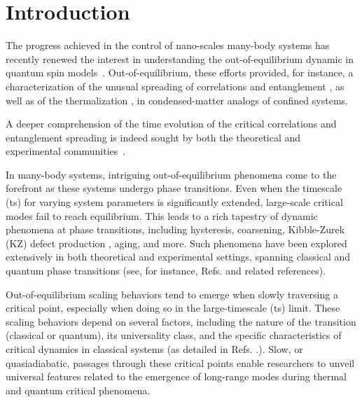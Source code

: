 \chapter{Introduction}

The progress achieved in the control of nano-scales many-body systems has recently renewed the interest in understanding the out-of-equilibrium dynamic in quantum spin models~\cite{PSSV-2011-noneqcoll, GAN-2014-quantumsimulation}. Out-of-equilibrium, these efforts provided, for instance, a characterization of the unusual spreading of correlations and entanglement \cite{kormos2017real,lerose2020quasilocalized,tortora2020relaxation,lagnese2022quenches,scopa2022entanglement,castro2020entanglement,vovrosh2021confinement,rigobello2021entanglement}, as well as of the thermalization \cite{birnkammer2022prethermalization,james2019nonthermal,robinson2019signatures,chanda2020confinement}, in condensed-matter analogs of confined systems.


A deeper comprehension of the time evolution of the critical correlations and entanglement spreading is indeed sought by both the theoretical and experimental communities~\cite{ADM-2015-EntanglementReview}.


In many-body systems, intriguing out-of-equilibrium phenomena come to the forefront as these systems undergo phase transitions. Even when the timescale (ts) for varying system parameters is significantly extended, large-scale critical modes fail to reach equilibrium. This leads to a rich tapestry of dynamic phenomena at phase transitions, including hysteresis, coarsening, Kibble-Zurek (KZ) defect production
\cite{kibble1976topology,kibble1980some,zurek1985cosmological,zurek1996cosmological}, aging, and more. Such phenomena have been explored extensively in both theoretical and experimental settings, spanning classical and quantum phase transitions (see, for instance, Refs.                                                                                                                                                                             \cite{binder1987theory, cui2020experimentally, bray2002theory, weiler2008spontaneous,
dziarmaga2010dynamics, PSSV-2011-noneqcoll, ulm2013observation}  and related references).

Out-of-equilibrium scaling behaviors tend to emerge when slowly traversing a critical point, especially when doing so in the large-timescale (ts) limit. These scaling behaviors depend on several factors, including the nature of the transition (classical or quantum), its universality class, and the specific characteristics of critical dynamics in classical systems (as detailed in Refs. \cite{kibble1980some, zurek1996cosmological, dziarmaga2010dynamics, PSSV-2011-noneqcoll}.). Slow, or quasiadiabatic, passages through these critical points enable researchers to unveil universal features related to the emergence of long-range modes during thermal and quantum critical phenomena.

